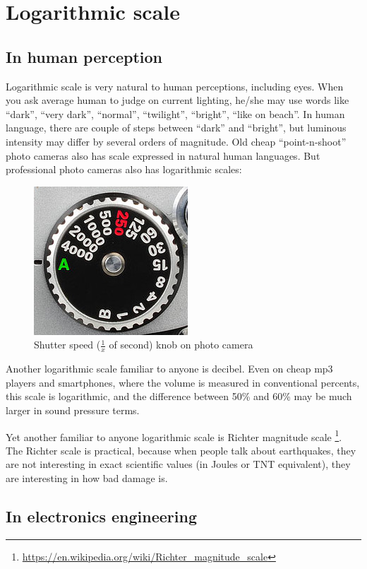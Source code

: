\section{Logarithmic scale}

\subsection{In human perception}

Logarithmic scale is very natural to human perceptions, including eyes.
When you ask average human to judge on current lighting, he/she may use words like ``dark'', ``very dark'', ``normal'', ``twilight'', ``bright'', 
``like on beach''.
In human language, there are couple of steps between ``dark'' and ``bright'', but luminous intensity may differ by several orders of magnitude.
Old cheap ``point-n-shoot'' photo cameras also has scale expressed in natural human languages.
But professional photo cameras also has logarithmic scales:

\begin{figure}[H]
\centering
\includegraphics[scale=0.66]{log/nikon.jpg}
\caption{Shutter speed ($\frac{1}{x}$ of second) knob on photo camera}
\end{figure}

Another logarithmic scale familiar to anyone is decibel.
Even on cheap mp3 players and smartphones, where the volume is measured in conventional percents, this scale is logarithmic, 
and the difference between 50\% and 60\% may be much larger in sound pressure terms.

Yet another familiar to anyone logarithmic scale is Richter magnitude scale
\footnote{\url{https://en.wikipedia.org/wiki/Richter_magnitude_scale}}.
The Richter scale is practical, because when people talk about earthquakes, they are not interesting in exact scientific values
(in Joules or TNT equivalent), they are interesting in how bad damage is.

\subsection{In electronics engineering}

